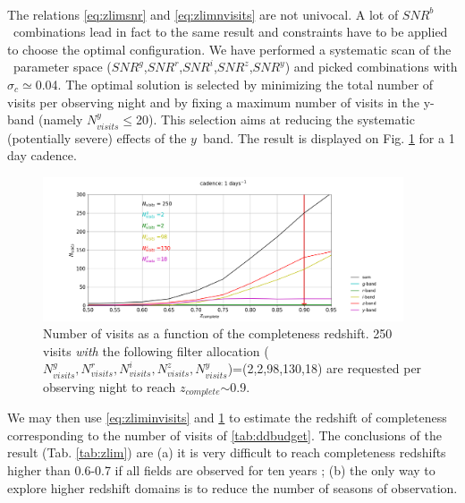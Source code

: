 \documentclass[\docopts]{\docclass}
\newcommand{\snrb}{\mbox{$SNR^b$}}
\newcommand{\snrg}{\mbox{$SNR^g$}}
\newcommand{\snrr}{\mbox{$SNR^r$}}
\newcommand{\snri}{\mbox{$SNR^i$}}
\newcommand{\snrz}{\mbox{$SNR^z$}}
\newcommand{\snry}{\mbox{$SNR^y$}}
\newcommand{\by}{{$y$}}
\newcommand{\sigc}{\mbox{$\sigma_c$}}
\newcommand{\zcomp}{\mbox{$z_{complete}$}}
\newcommand{\seq}{$\sim$}
\newcommand{\nvisitsy}{$N_{visits}^y$}
\newcommand{\nvisitsall}{$N_{visits}^g,N_{visits}^r,N_{visits}^i,N_{visits}^z,N_{visits}^y$}
\begin{document}
{\\
The relations \eqref{eq:zlimsnr} and \eqref{eq:zlimnvisits} are not univocal. A lot of \snrb~combinations lead in fact to the same result and constraints have to be applied to choose the optimal configuration. We have performed a systematic scan of the \snr~parameter space (\snrg,\snrr,\snri,\snrz,\snry) and picked combinations with \sigc$\simeq$0.04.  The optimal solution is selected by minimizing the total number of visits per observing night and by fixing a maximum number of visits in the y-band (namely \nvisitsy$\leq$20). This selection aims at reducing the systematic (potentially severe) effects of the \by~band. The result is displayed on Fig. \ref{fig:nvisits_zlim} for a 1 day cadence. 

\begin{figure}[htbp]
\begin{center}
  \includegraphics[width=0.95\textwidth]{nvisits_zlim.png}
 \caption{Number of visits as a function of the completeness redshift. 250 visits {\it with} the following filter allocation (\nvisitsall)=(2,2,98,130,18) are requested per observing night to reach \zcomp\seq0.9.}\label{fig:nvisits_zlim}
\end{center}
\end{figure}
We may then use \ref{eq:zliminvisits} and \ref{fig:nvisits_zlim} to estimate the redshift of completeness corresponding to the number of visits of \ref{tab:ddbudget}. The conclusions of the result (Tab. \ref{tab:zlim}) are (a) it is very difficult to reach completeness redshifts higher than 0.6-0.7 if all fields are observed for ten years ; (b) the only way to explore higher  redshift domains is to reduce the number of seasons of observation.

}
\end{document}
